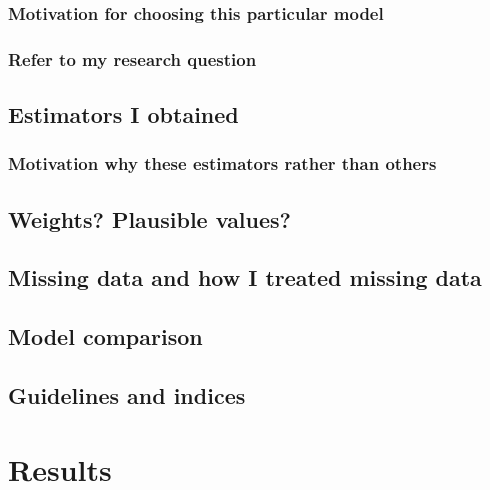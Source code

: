 \documentclass[a4paper,11pt,UKenglish,twoside,openright]{report}\usepackage[]{graphicx}\usepackage[]{color}
\begin{document}
\subsection{Motivation for choosing this particular model}

\subsection{Refer to my research question}

\section{Estimators I obtained}

\subsection{Motivation why these estimators rather than others}

\section{Weights? Plausible values?}

\section{Missing data and how I treated missing data}

\section{Model comparison}

\section{Guidelines and indices}



\chapter{Results}
\label{chp:5}


\end{document}
